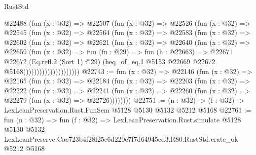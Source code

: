 \begin{lexlean}{RustStd}
\begin{coremodule}
                      @22488
                        (fun (x : @32) =>
                        @22507
                          (fun (x : @32) =>
                          @22526
                            (fun (x : @32) =>
                            @22545
                              (fun (x : @32) =>
                              @22564
                                (fun (x : @32) =>
                                @22583
                                  (fun (x : @32) =>
                                  @22602
                                    (fun (x : @32) =>
                                    @22621
                                      (fun (x : @32) =>
                                      @22640
                                        (fun (x : @32) =>
                                        @22659
                                          (fun (x : @32) =>
                                          fun (fn : @29) =>
                                          fun (h : @22663) =>
                                          @22671
                                            @22672
                                            (Eq.refl.{2} (Sort 1) @29)
                                            (heq_of_eq.{1}
                                              @5153
                                              @22669
                                              @22672
                                              @5168)))))))))))))))))))))
@22743 := fun (x : @32) =>
  @22146
    (fun (x : @32) =>
    @22165
      (fun (x : @32) =>
      @22184
        (fun (x : @32) =>
        @22203
          (fun (x : @32) =>
          @22222
            (fun (x : @32) =>
            @22241
              (fun (x : @32) => @22260 (fun (x : @32) => @22279 (fun (x : @32) => @22726))))))))
@22751 := (n : @32) -> (f : @32) -> LexLeanPreservation.Rust.FunSem @5128 @5130 @5132 @5212 @5168
@22761 := fun (n : @32) =>
  fun (f : @32) =>
  LexLeanPreservation.Rust.simulate
    @5128
    @5130
    @5132
    LexLeanPreserve.Cae723b4f28f25c6d220e7f7d64945ed3.R80.RustStd.crate_ok
    @5212
    @5168
\end{coremodule}
\end{lexlean}
